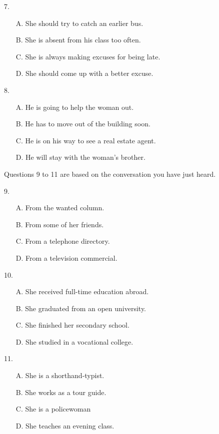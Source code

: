 \documentclass[UTF8,11pt]{ctexart}
\begin{document}
7.


\begin{itemize}[leftmargin=2em,itemsep=.2em,topsep=.4em]\item[A.] She should try to catch an earlier bus.
\item[B.] She is absent from his class too often.
\item[C.] She is always making excuses for being late.
\item[D.] She should come up with a better excuse.
\end{itemize}

8.


\begin{itemize}[leftmargin=2em,itemsep=.2em,topsep=.4em]\item[A.] He is going to help the woman out.
\item[B.] He has to move out of the building soon.
\item[C.] He is on his way to see a real estate agent.
\item[D.] He will stay with the woman’s brother.
\end{itemize}

Questions 9 to 11 are based on the conversation you have just heard.


9.


\begin{itemize}[leftmargin=2em,itemsep=.2em,topsep=.4em]\item[A.] From the wanted column.
\item[B.] From some of her friends.
\item[C.] From a telephone directory.
\item[D.] From a television commercial.
\end{itemize}

10.


\begin{itemize}[leftmargin=2em,itemsep=.2em,topsep=.4em]\item[A.] She received full-time education abroad.
\item[B.] She graduated from an open university.
\item[C.] She finished her secondary school.
\item[D.] She studied in a vocational college.
\end{itemize}

11.


\begin{itemize}[leftmargin=2em,itemsep=.2em,topsep=.4em]\item[A.] She is a shorthand-typist.
\item[B.] She works as a tour guide.
\item[C.] She is a policewoman
\item[D.] She teaches an evening class.
\end{itemize}
\end{document}
